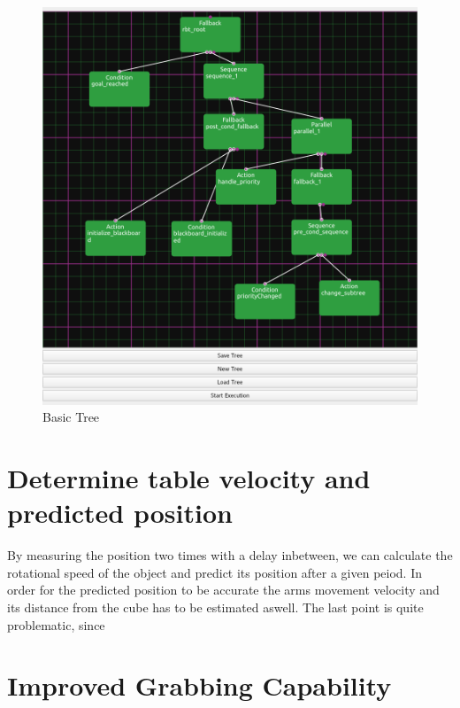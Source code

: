 \documentclass[report]{iisthesis}
\begin{document}
\begin{figure}[h]
    \caption{Basic Tree}
    \includegraphics[scale=0.2]{basicTree.png}
\end{figure}

\section{Determine table velocity and predicted position}
By measuring the position two times with a delay inbetween, we can calculate the rotational speed of the object and predict its position after a given peiod.
In order for the predicted position to be accurate the arms movement velocity and its distance from the cube has to be estimated aswell.
The last point is quite problematic, since 

\section{Improved Grabbing Capability}
\end{document}
